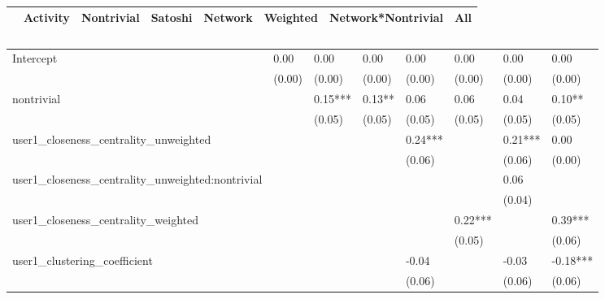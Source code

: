 \begin{table}
\caption{}
\begin{center}
\begin{tabular}{lccccccc}
\hline
                                                 & Activity & Nontrivial & Satoshi & Network &   Weighted   & Network*Nontrivial &   All     \\
\hline
\hline
\end{tabular}
\begin{tabular}{llllllll}
Intercept                                        & 0.00     & 0.00       & 0.00    & 0.00    & 0.00         & 0.00               & 0.00      \\
                                                 & (0.00)   & (0.00)     & (0.00)  & (0.00)  & (0.00)       & (0.00)             & (0.00)    \\
nontrivial                                       &          & 0.15***    & 0.13**  & 0.06    & 0.06         & 0.04               & 0.10**    \\
                                                 &          & (0.05)     & (0.05)  & (0.05)  & (0.05)       & (0.05)             & (0.05)    \\
user1_closeness_centrality_unweighted            &          &            &         & 0.24*** &              & 0.21***            & 0.00      \\
                                                 &          &            &         & (0.06)  &              & (0.06)             & (0.00)    \\
user1_closeness_centrality_unweighted:nontrivial &          &            &         &         &              & 0.06               &           \\
                                                 &          &            &         &         &              & (0.04)             &           \\
user1_closeness_centrality_weighted              &          &            &         &         & 0.22***      &                    & 0.39***   \\
                                                 &          &            &         &         & (0.05)       &                    & (0.06)    \\
user1_clustering_coefficient                     &          &            &         & -0.04   &              & -0.03              & -0.18***  \\
                                                 &          &            &         & (0.06)  &              & (0.06)             & (0.06)    \\

\end{tabular}
\end{center}
\end{table}
